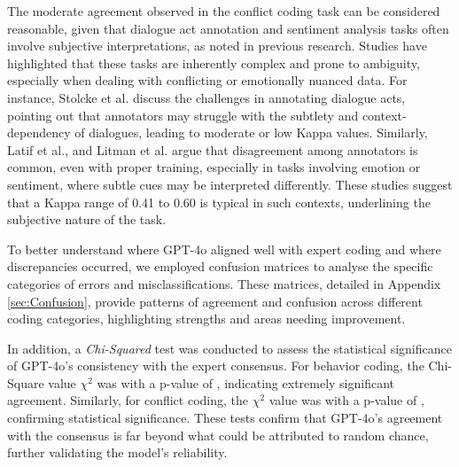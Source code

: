
The moderate agreement observed in the conflict coding task can be considered reasonable, given that dialogue act annotation and sentiment analysis tasks often involve subjective interpretations, as noted in previous research. Studies have highlighted that these tasks are inherently complex and prone to ambiguity, especially when dealing with conflicting or emotionally nuanced data. For instance, Stolcke et al. \cite{stolcke2000dialogue} discuss the challenges in annotating dialogue acts, pointing out that annotators may struggle with the subtlety and context-dependency of dialogues, leading to moderate or low Kappa values. Similarly, Latif et al.\cite{latif2023can}, and Litman et al. \cite{litman2003recognizing} argue that disagreement among annotators is common, even with proper training, especially in tasks involving emotion or sentiment, where subtle cues may be interpreted differently. These studies suggest that a Kappa range of 0.41 to 0.60 is typical in such contexts, underlining the subjective nature of the task.



 To better understand where GPT-4o aligned well with expert coding and where discrepancies occurred, we employed confusion matrices to analyse the specific categories of errors and misclassifications. These matrices, detailed in Appendix \ref{sec:Confusion}, provide patterns of agreement and confusion across different coding categories, highlighting strengths and areas needing improvement.


In addition, a \textit{Chi-Squared} test was conducted to assess the statistical significance of GPT-4o's consistency with the expert consensus. For behavior coding, the Chi-Square value $\chi^2$ was  with a p-value of , indicating extremely significant agreement. Similarly, for conflict coding, the $\chi^2$ value was  with a p-value of , confirming statistical significance. These tests confirm that GPT-4o's agreement with the consensus is far beyond what could be attributed to random chance, further validating the model's reliability.

